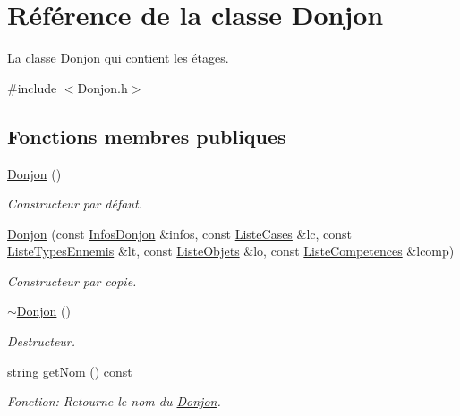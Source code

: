 \hypertarget{classDonjon}{}\section{Référence de la classe Donjon}
\label{classDonjon}


La classe \mbox{\hyperlink{classDonjon}{Donjon}} qui contient les étages.  




{\ttfamily \#include $<$Donjon.\+h$>$}

\subsection*{Fonctions membres publiques}
\begin{DoxyCompactItemize}
\item 
\mbox{\label{classDonjon_abef394a07994262d7cd512a80eab3dfb}} 
\mbox{\hyperlink{classDonjon_abef394a07994262d7cd512a80eab3dfb}{Donjon}} ()
\begin{DoxyCompactList}\small\item\em Constructeur par défaut. \end{DoxyCompactList}\item 
\mbox{\hyperlink{classDonjon_ac48017f89fae7a792d378b5cfc649d86}{Donjon}} (const \mbox{\hyperlink{structInfosDonjon}{Infos\+Donjon}} \&infos, const \mbox{\hyperlink{structListeCases}{Liste\+Cases}} \&lc, const \mbox{\hyperlink{structListeTypesEnnemis}{Liste\+Types\+Ennemis}} \&lt, const \mbox{\hyperlink{structListeObjets}{Liste\+Objets}} \&lo, const \mbox{\hyperlink{structListeCompetences}{Liste\+Competences}} \&lcomp)
\begin{DoxyCompactList}\small\item\em Constructeur par copie. \end{DoxyCompactList}\item 
\mbox{\hyperlink{classDonjon_ad35146a4451da9c5a08a67fa69e0c32c}{$\sim$\+Donjon}} ()
\begin{DoxyCompactList}\small\item\em Destructeur. \end{DoxyCompactList}\item 
string \mbox{\hyperlink{classDonjon_ab9eb0d68d0df634cbeb931473cc31ffc}{get\+Nom}} () const
\begin{DoxyCompactList}\small\item\em Fonction\+: Retourne le nom du \mbox{\hyperlink{classDonjon}{Donjon}}. \end{DoxyCompactList}\item 

\end{DoxyCompactItemize}
